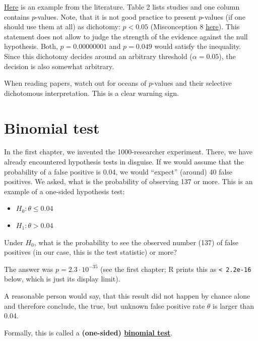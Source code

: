 \documentclass[
]{book}
\providecommand{\tightlist}{%
  \setlength{\itemsep}{0pt}\setlength{\parskip}{0pt}}
\begin{document}
\href{https://www.tandfonline.com/doi/full/10.1080/09593980601023754\#d1e100}{Here} is an example from the literature.
Table 2 lists studies and one column contains \(p\)-values. Note, that it is not good practice to present \(p\)-values
(if one should use them at all) as dichotomy: \(p < 0.05\)
(Misconception 8 \href{https://sixsigmadsi.com/wp-content/uploads/2020/10/A-Dirty-Dozen-Twelve-P-Value-Misconceptions.pdf}{here}). This statement does
not allow to judge the strength of the evidence against the null hypothesis. Both, \(p = 0.00000001\) and \(p = 0.049\) would satisfy
the inequality. Since this dichotomy decides around an arbitrary threshold (\(\alpha = 0.05\)),
the decision is also somewhat arbitrary.

When reading papers, watch out for oceans of \(p\)-values and their selective dichotomous interpretation. This is a clear warning sign.

\section{Binomial test}\label{binomial-test}

In the first chapter, we invented the 1000-researcher experiment. There, we have already encountered hypothesis tests in disguise.
If we would assume that the probability of a false positive is 0.04,
we would ``expect'' (around) 40 false positives. We asked, what is the probability of observing
137 or more. This is an example of a one-sided hypothesis test:

\begin{itemize}
\tightlist
\item
  \(H_0: \theta \le 0.04\)
\item
  \(H_1: \theta > 0.04\)
\end{itemize}

Under \(H_0\), what is the probability to see the observed number (137) of
false positives (in our case, this is the test statistic) or more?

The answer was \(p = 2.3 \cdot 10^{-35}\) (see the first chapter; R prints this as \texttt{\textless{}\ 2.2e-16} below, which is just its display limit).

A reasonable person would say, that this result did not happen by chance alone and
therefore conclude, the true, but unknown false positive rate \(\theta\) is larger than 0.04.

Formally, this is called a \textbf{(one-sided) \href{https://en.wikipedia.org/wiki/Binomial_test}{binomial test}}.
\end{document}
